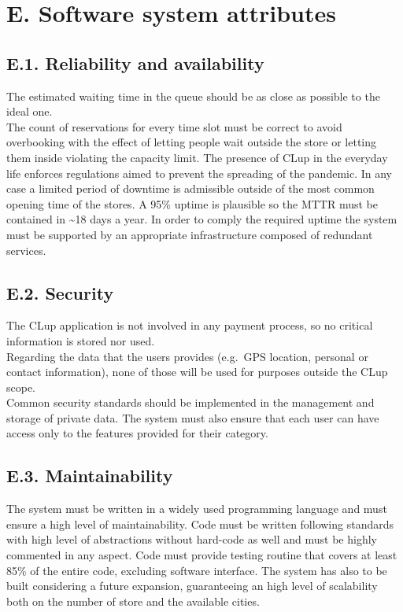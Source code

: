 \clearpage
\section{E. Software system attributes}

\subsection{E.1. Reliability and availability}

The estimated waiting time in the queue should be as close as possible to the ideal one.\\
The count of reservations for every time slot must be correct to avoid overbooking with the effect of letting people wait outside the store or letting them inside violating the capacity limit. The presence of CLup in the everyday life enforces regulations aimed to prevent the spreading of the pandemic. In any case a limited period of downtime is admissible outside of the most common opening time of the stores. A 95\% uptime is plausible so the MTTR must be contained in \textasciitilde18 days a year. In order to comply the required uptime the system must be supported by an appropriate infrastructure composed of redundant services.

\subsection{E.2. Security}

The CLup application is not involved in any payment process, so no critical information is stored nor used.\\
Regarding the data that the users provides (e.g.~GPS location, personal or contact information), none of those will be used for purposes outside the CLup scope.\\
Common security standards should be implemented in the management and storage of private data. The system must also ensure that each user can have access only to the features provided for their category.

\subsection{E.3. Maintainability}

The system must be written in a widely used programming language and must ensure a high level of maintainability. Code must be written following standards with high level of abstractions without hard-code as well and must be highly commented in any aspect. Code must provide testing routine that covers at least 85\% of the entire code, excluding software interface. The system has also to be built considering a future expansion, guaranteeing an high level of scalability both on the number of store and the available cities.

